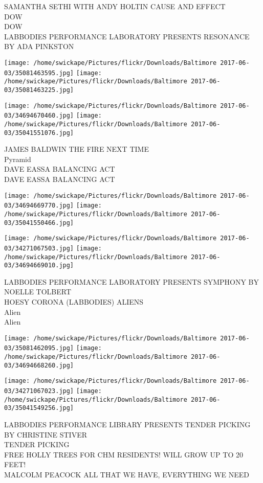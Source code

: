 \documentclass[10pt,letterpaper]{article}
\begin{document}
SAMANTHA SETHI WITH ANDY HOLTIN CAUSE AND EFFECT\\
DOW\\
DOW\\
LABBODIES PERFORMANCE LABORATORY PRESENTS RESONANCE BY ADA PINKSTON
\pagebreak

\texttt{[image: /home/swickape/Pictures/flickr/Downloads/Baltimore 2017-06-03/35081463595.jpg]}
\texttt{[image: /home/swickape/Pictures/flickr/Downloads/Baltimore 2017-06-03/35081463225.jpg]}

\texttt{[image: /home/swickape/Pictures/flickr/Downloads/Baltimore 2017-06-03/34694670460.jpg]}
\texttt{[image: /home/swickape/Pictures/flickr/Downloads/Baltimore 2017-06-03/35041551076.jpg]}

JAMES BALDWIN THE FIRE NEXT TIME\\
Pyramid\\
DAVE EASSA BALANCING ACT\\
DAVE EASSA BALANCING ACT
\pagebreak

\texttt{[image: /home/swickape/Pictures/flickr/Downloads/Baltimore 2017-06-03/34694669770.jpg]}
\texttt{[image: /home/swickape/Pictures/flickr/Downloads/Baltimore 2017-06-03/35041550466.jpg]}

\texttt{[image: /home/swickape/Pictures/flickr/Downloads/Baltimore 2017-06-03/34271067503.jpg]}
\texttt{[image: /home/swickape/Pictures/flickr/Downloads/Baltimore 2017-06-03/34694669010.jpg]}

LABBODIES PERFORMANCE LABORATORY PRESENTS SYMPHONY BY NOELLE TOLBERT\\
HOESY CORONA (LABBODIES) ALIENS\\
Alien\\
Alien
\pagebreak

\texttt{[image: /home/swickape/Pictures/flickr/Downloads/Baltimore 2017-06-03/35081462095.jpg]}
\texttt{[image: /home/swickape/Pictures/flickr/Downloads/Baltimore 2017-06-03/34694668260.jpg]}

\texttt{[image: /home/swickape/Pictures/flickr/Downloads/Baltimore 2017-06-03/34271067023.jpg]}
\texttt{[image: /home/swickape/Pictures/flickr/Downloads/Baltimore 2017-06-03/35041549256.jpg]}

LABBODIES PERFORMANCE LIBRARY PRESENTS TENDER PICKING BY CHRISTINE STIVER\\
TENDER PICKING\\
FREE HOLLY TREES FOR CHM RESIDENTS!  WILL GROW UP TO 20 FEET!\\
MALCOLM PEACOCK ALL THAT WE HAVE, EVERYTHING WE NEED
\pagebreak
\end{document}
